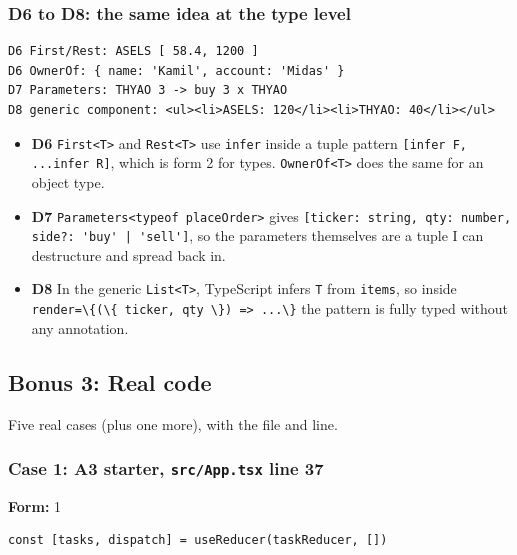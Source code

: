 \documentclass[
  11pt,
]{article}
\newcommand{\passthrough}[1]{#1}
\providecommand{\tightlist}{%
  \setlength{\itemsep}{0pt}\setlength{\parskip}{0pt}}
\begin{document}
\subsubsection{D6 to D8: the same idea at the type
level}\label{d6-to-d8-the-same-idea-at-the-type-level}

\begin{lstlisting}
D6 First/Rest: ASELS [ 58.4, 1200 ]
D6 OwnerOf: { name: 'Kamil', account: 'Midas' }
D7 Parameters: THYAO 3 -> buy 3 x THYAO
D8 generic component: <ul><li>ASELS: 120</li><li>THYAO: 40</li></ul>
\end{lstlisting}

\begin{itemize}
\tightlist
\item
  \textbf{D6} \passthrough{\lstinline!First<T>!} and
  \passthrough{\lstinline!Rest<T>!} use \passthrough{\lstinline!infer!}
  inside a tuple pattern
  \passthrough{\lstinline![infer F, ...infer R]!}, which is form 2 for
  types. \passthrough{\lstinline!OwnerOf<T>!} does the same for an
  object type.
\item
  \textbf{D7} \passthrough{\lstinline!Parameters<typeof placeOrder>!}
  gives
  \passthrough{\lstinline![ticker: string, qty: number, side?: 'buy' | 'sell']!},
  so the parameters themselves are a tuple I can destructure and spread
  back in.
\item
  \textbf{D8} In the generic \passthrough{\lstinline!List<T>!},
  TypeScript infers \passthrough{\lstinline!T!} from
  \passthrough{\lstinline!items!}, so inside
  \passthrough{\lstinline!render=\{(\{ ticker, qty \}) => ...\}!} the
  pattern is fully typed without any annotation.
\end{itemize}

\subsection{Bonus 3: Real code}\label{bonus-3-real-code}

Five real cases (plus one more), with the file and line.

\subsubsection{\texorpdfstring{Case 1: A3 starter, \texttt{src/App.tsx}
line
37}{Case 1: A3 starter, src/App.tsx line 37}}\label{case-1-a3-starter-srcapp.tsx-line-37}

\textbf{Form:} 1

\begin{lstlisting}
const [tasks, dispatch] = useReducer(taskReducer, [])
\end{lstlisting}
\end{document}
